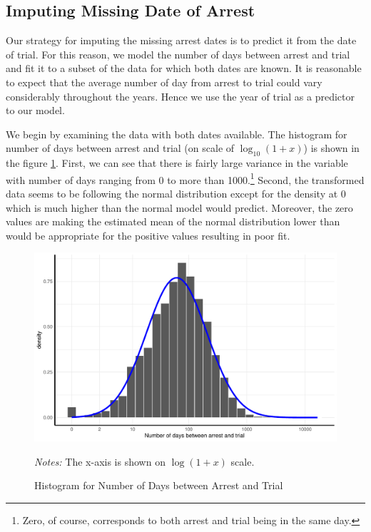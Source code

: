 
\subsection{Imputing Missing Date of Arrest} \label{subsec:imputing_missing_date}
Our strategy for imputing the missing arrest dates is to  predict it from the date of trial. For this reason, we model the number of days between arrest and trial and fit it to a subset of the data for which both dates are known. It  is reasonable to expect that the average number of day from  arrest to trial could  vary considerably throughout the years.    %
Hence we use the year of trial as a predictor to our model. 

We begin by examining the data with both dates available. 
The histogram for number of days between arrest and trial (on scale of $\log_{10}(1 + x)$) is shown in the figure \ref{fig:simple_lm_hist}. First, we can see that there is fairly large variance in the variable with   number of days ranging from 0 to more than 1000.\footnote{Zero, of course, corresponds to both arrest and trial being in the same day.}  Second, the transformed data seems to be following the normal distribution except for the density at 0
 which is much higher than the normal model would predict. Moreover, the  zero values are making the estimated mean of the normal distribution lower than would be appropriate for the positive values resulting in poor fit. 

 \begin{figure}[h]
\centering
\caption{Histogram for Number of Days between Arrest and Trial}
\includegraphics[width=\textwidth]{plots/imputing_arrest_date/simple_lm_hist.pdf}
\label{fig:simple_lm_hist}
\begin{minipage}{0.92\textwidth}
\footnotesize
\emph{Notes:} The x-axis is shown on  $\log(1 + x)$ scale.
\end{minipage}

\end{figure}

